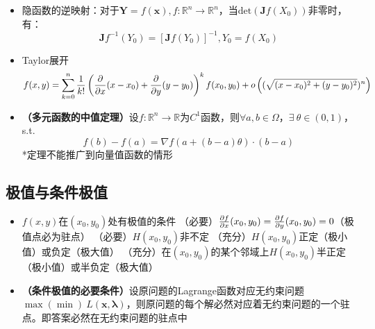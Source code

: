 \documentclass[./main.tex]{subfiles}
\begin{document}
\begin{itemize}
  \item 隐函数的逆映射：对于$\bm{Y}=f(\bm{x}),f:\mathbb{R}^n\rightarrow\mathbb{R}^n$，当$\text{det}(\bm{J}f(X_0))$非零时，有：
  $$\bm{J}f^{-1}(Y_0)=[\bm{J}f(Y_0)]^{-1},Y_0=f(X_0)$$
  \item[\ding{72}] Taylor展开
  $$f(x,y)=\sum_{k=0}^{n}\frac{1}{k!}\left(\frac{\partial}{\partial x}(x-x_0)+\frac{\partial}{\partial y}(y-y_0)\right)^kf(x_0,y_0)+o\left((\sqrt{(x-x_0)^2+(y-y_0)^2})^n\right)$$
  \item[\ding{72}] \textbf{（多元函数的中值定理）}设$f:\mathbb{R}^n\rightarrow\mathbb{R}$为$C^1$函数，则$\forall a,b\in\Omega$，$\exists\ \theta\in(0,1)$，s.t.
  $$f(b)-f(a)=\nabla f(a+(b-a)\theta)\cdot(b-a)$$
  *定理不能推广到向量值函数的情形
\end{itemize}
\subsection{极值与条件极值}
\begin{itemize}
  \item[\ding{72}] $f(x,y)$在$(x_0,y_0)$处有极值的条件
  \subitem （必要）$\frac{\partial f}{\partial x}(x_0,y_0)=\frac{\partial f}{\partial y}(x_0,y_0)=0$（极值点必为驻点）
  \subitem （必要）$H(x_0,y_0)$非不定
  \subitem （充分）$H(x_0,y_0)$正定（极小值）或负定（极大值）
  \subitem （充分）在$(x_0,y_0)$的某个邻域上$H(x_0,y_0)$半正定（极小值）或半负定（极大值）
  \item \textbf{（条件极值的必要条件）}设原问题的Lagrange函数对应无约束问题$\max(\min)\ L(\bm{x},\bm{\lambda})$，则原问题的每个解必然对应着无约束问题的一个驻点。即答案必然在无约束问题的驻点中
\end{itemize}
\end{document}
